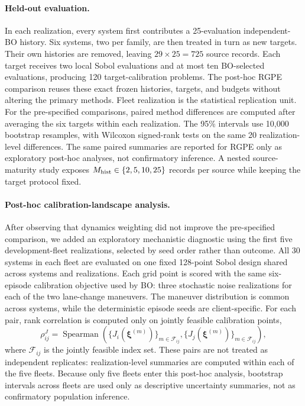 \documentclass{l4dc2026}
\begin{document}
\paragraph{Held-out evaluation.}
 In each realization, every system first contributes a 25-evaluation independent-BO history. Six systems, two per family, are then treated in turn as new targets. Their own histories are removed, leaving $29\times25=725$ source records. Each target receives two local Sobol evaluations and at most ten BO-selected evaluations, producing 120 target-calibration problems. The post-hoc RGPE comparison reuses these exact frozen histories, targets, and budgets without altering the primary methods. Fleet realization is the statistical replication unit. For the pre-specified comparisons, paired method differences are computed after averaging the six targets within each realization. The 95\% intervals use 10,000 bootstrap resamples, with Wilcoxon signed-rank tests on the same 20 realization-level differences. The same paired summaries are reported for RGPE only as exploratory post-hoc analyses, not confirmatory inference. A nested source-maturity study exposes $M_{\rm hist}\in\{2,5,10,25\}$ records per source while keeping the target protocol fixed.

\paragraph{Post-hoc calibration-landscape analysis.}
After observing that dynamics weighting did not improve the pre-specified comparison, we added an exploratory mechanistic diagnostic using the first five development-fleet realizations, selected by seed order rather than outcome. All 30 systems in each fleet are evaluated on one fixed 128-point Sobol design shared across systems and realizations. Each grid point is scored with the same six-episode calibration objective used by BO: three stochastic noise realizations for each of the two lane-change maneuvers. The maneuver distribution is common across systems, while the deterministic episode seeds are client-specific. For each pair, rank correlation is computed only on jointly feasible calibration points,
\begin{equation}
 \rho_{ij}^{J}
 =\operatorname{Spearman}\!\left(
 \{J_i(\boldsymbol{\xi}^{(m)})\}_{m\in\mathcal F_{ij}},
 \{J_j(\boldsymbol{\xi}^{(m)})\}_{m\in\mathcal F_{ij}}
 \right),
 \label{eq:landscape_similarity}
\end{equation}
where $\mathcal F_{ij}$ is the jointly feasible index set.  These pairs are not treated as independent replicates: realization-level summaries are computed within each of the five fleets. Because only five fleets enter this post-hoc analysis, bootstrap intervals across fleets are used only as descriptive uncertainty summaries, not as confirmatory population inference.
\end{document}
